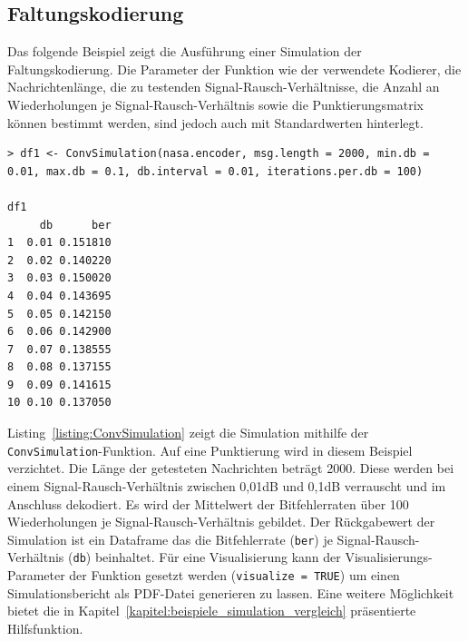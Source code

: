 \subsection{Faltungskodierung}
\label{kapitel:beispiele_simulation_faltungskodierung}
Das folgende Beispiel zeigt die Ausführung einer Simulation der Faltungskodierung. Die Parameter der Funktion wie der verwendete Kodierer, die Nachrichtenlänge, die zu testenden Signal-Rausch-Verhältnisse, die Anzahl an Wiederholungen je Signal-Rausch-Verhältnis sowie die Punktierungsmatrix können bestimmt werden, sind jedoch auch mit Standardwerten hinterlegt.
\begin{lstlisting}[caption=Simulation der Faltungskodierung, label={listing:ConvSimulation}, float=!th]
> df1 <- ConvSimulation(nasa.encoder, msg.length = 2000, min.db = 0.01, max.db = 0.1, db.interval = 0.01, iterations.per.db = 100)

df1
     db      ber
1  0.01 0.151810
2  0.02 0.140220
3  0.03 0.150020
4  0.04 0.143695
5  0.05 0.142150
6  0.06 0.142900
7  0.07 0.138555
8  0.08 0.137155
9  0.09 0.141615
10 0.10 0.137050
\end{lstlisting}
Listing~\ref{listing:ConvSimulation} zeigt die Simulation mithilfe der \texttt{ConvSimulation}-Funktion. Auf eine Punktierung wird in diesem Beispiel verzichtet. Die Länge der getesteten Nachrichten beträgt 2000. Diese werden bei einem Signal-Rausch-Verhältnis zwischen 0,01dB und 0,1dB verrauscht und im Anschluss dekodiert. Es wird der Mittelwert der Bitfehlerraten über 100 Wiederholungen je Signal-Rausch-Verhältnis gebildet. Der Rückgabewert der Simulation ist ein Dataframe das die Bitfehlerrate (\texttt{ber}) je Signal-Rausch-Verhältnis (\texttt{db}) beinhaltet. Für eine Visualisierung kann der Visualisierungs-Parameter der Funktion gesetzt werden (\texttt{visualize = TRUE}) um einen Simulationsbericht als PDF-Datei generieren zu lassen. Eine weitere Möglichkeit bietet die in Kapitel~\ref{kapitel:beispiele_simulation_vergleich} präsentierte Hilfsfunktion.

